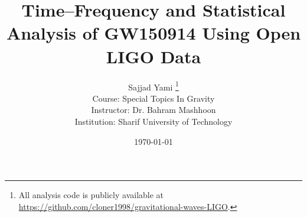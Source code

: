 \documentclass[11pt]{article}
\title{\textbf{Time–Frequency and Statistical Analysis of GW150914 Using Open LIGO Data}}
\author{
	Sajjad Yami \thanks{All analysis code is publicly available at \url{https://github.com/cloner1998/gravitational-waves-LIGO}.}
	\\
	Course: Special Topics In Gravity \\
	Instructor: Dr. Bahram Mashhoon \\
	Institution: Sharif University of Technology \\
}
\date{\today}
\begin{document}
\maketitle

\begin{abstract}

\end{abstract}










\end{document}

